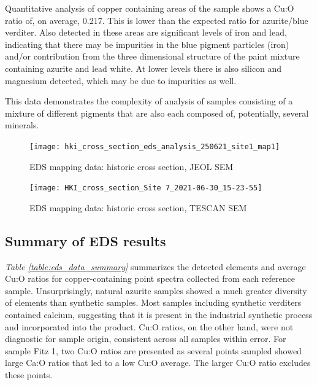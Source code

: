 Quantitative analysis of copper containing areas of the sample shows a Cu:O ratio of, on average, 0.217. This is lower than the expected ratio for azurite/blue verditer. Also detected in these areas are significant levels of iron and lead, indicating that there may be impurities in the blue pigment particles (iron) and/or contribution from the three dimensional structure of the paint mixture containing azurite and lead white. At lower levels there is also silicon and magnesium detected, which may be due to impurities as well. 

This data demonstrates the complexity of analysis of samples consisting of a mixture of different pigments that are also each composed of, potentially, several minerals.



\begin{figure}[H]
\centering
  \texttt{[image: hki\_cross\_section\_eds\_analysis\_250621\_site1\_map1]}
\caption[EDS mapping data: historic cross section, JEOL SEM]{EDS mapping data: historic cross section, JEOL SEM}
\label{fig:xsection_map1}
\end{figure}

\begin{figure}[H]
\centering
  \texttt{[image: HKI\_cross\_section\_Site 7\_2021-06-30\_15-23-55]}
\caption[EDS mapping data: historic cross section, TESCAN SEM]{EDS mapping data: historic cross section, TESCAN SEM}
\label{fig:xsection_map2}
\end{figure}

\subsection[Summary of EDS results]{Summary of EDS results}

\textit{Table \ref{table:eds_data_summary}} summarizes the detected elements and average Cu:O ratios for copper-containing point spectra collected from each reference sample. Unsurprisingly, natural azurite samples showed a much greater diversity of elements than synthetic samples. Most samples including synthetic verditers contained calcium, suggesting that it is present in the industrial synthetic process and incorporated into the product. Cu:O ratios, on the other hand, were not diagnostic for sample origin, consistent across all samples within error. For sample Fitz 1, two Cu:O ratios are presented as several points sampled showed large Ca:O ratios that led to a low Cu:O average. The larger Cu:O ratio excludes these points.


